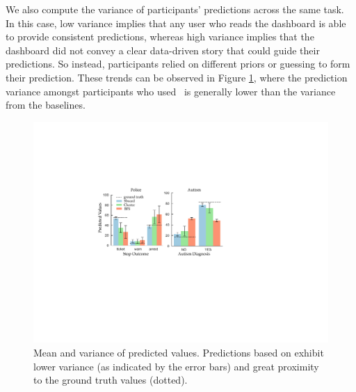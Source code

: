 \par We also compute the variance of participants' predictions across the same task. In this case, low variance implies that any user who reads the dashboard is able to provide consistent predictions, whereas high variance implies that the dashboard did not convey a clear data-driven story that could guide their predictions. So instead, participants relied on different priors or guessing to form their prediction. These trends can be observed in Figure \ref{fig:actual_predictions}, where the prediction variance amongst participants who used \system\ is generally lower than the variance from the baselines.
\begin{figure}[h!]
\centering
\includegraphics[width=\linewidth]{figures/prediction.pdf}
\caption{Mean and variance of predicted values. Predictions based on \system exhibit lower variance (as indicated by the error bars) and great proximity to the ground truth values (dotted).}
\label{fig:actual_predictions}
\end{figure}